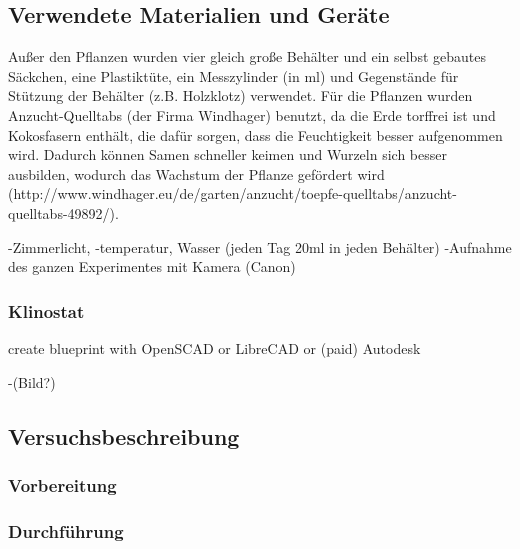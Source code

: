 \documentclass[
a4paper, 
11pt, 
ngerman,
listof=totoc,
bibliography=totocnumbered,
abstracton
]{scrreprt}
\begin{document}
\subsection{Verwendete Materialien und Geräte}
Außer den Pflanzen wurden vier gleich große Behälter und ein selbst gebautes Säckchen, eine Plastiktüte, ein Messzylinder (in ml) und Gegenstände für Stützung der Behälter (z.B. Holzklotz) verwendet. Für die Pflanzen wurden Anzucht-Quelltabs (der Firma Windhager) benutzt, da die Erde torffrei ist und Kokosfasern enthält, die dafür sorgen, dass die Feuchtigkeit besser aufgenommen wird. Dadurch können Samen schneller keimen und Wurzeln sich besser ausbilden, wodurch das Wachstum der Pflanze gefördert wird (http://www.windhager.eu/de/garten/anzucht/toepfe-quelltabs/anzucht-quelltabs-49892/). 

-Zimmerlicht, -temperatur, Wasser (jeden Tag 20ml in jeden Behälter)
-Aufnahme des ganzen Experimentes mit Kamera (Canon)

\subsubsection{Klinostat}

create blueprint with OpenSCAD or LibreCAD or (paid) Autodesk

-(Bild?)

\subsection{Versuchsbeschreibung}

\subsubsection{Vorbereitung}

\subsubsection{Durchführung}




\end{document}
